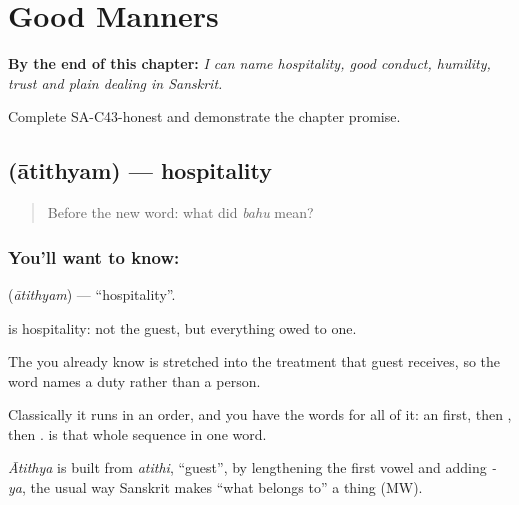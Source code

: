 
\chapter{Good Manners}
\label{ch:sa-good-manners}

\begin{chapteropening}
\textbf{By the end of this chapter:} \emph{I can name hospitality, good conduct, humility, trust and plain dealing in Sanskrit.}

Complete SA-C43-honest and demonstrate the chapter promise.
\end{chapteropening}

\section[\texorpdfstring{\sk{आतिथ्यम्} (ātithyam)}{आतिथ्यम् (ātithyam)}]{ (ātithyam) — hospitality}

\label{lesson:SA-C43-hospitality}



\begin{quote}
Before the new word: what did \emph{bahu} mean?
\end{quote}

\subsection*{You'll want to know: }
\textbf{} (\emph{ātithyam}) — \textquotedblleft{}hospitality\textquotedblright{}.

\textbf{} is hospitality: not the guest, but everything owed to one.

The  you already know is stretched into the treatment that guest receives, so the word names a duty rather than a person.

Classically it runs in an order, and you have the words for all of it: an  first, then , then . \textbf{} is that whole sequence in one word.

\begin{cousinweb}
\emph{Ātithya} is built from \emph{atithi}, \textquotedblleft{}guest\textquotedblright{}, by lengthening the first vowel and adding \emph{-ya}, the usual way Sanskrit makes \textquotedblleft{}what belongs to\textquotedblright{} a thing (MW).
\end{cousinweb}

